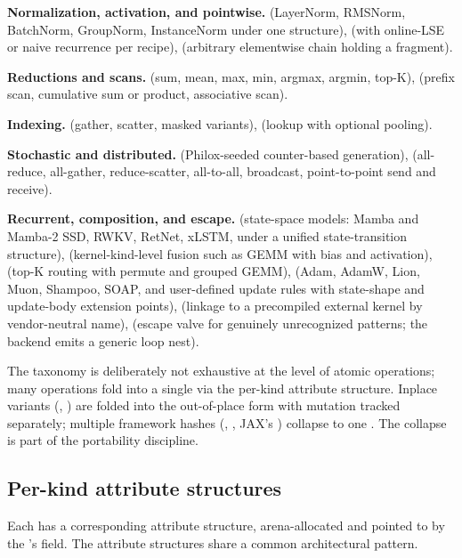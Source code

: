 \textbf{Normalization, activation, and pointwise.}
 (LayerNorm, RMSNorm, BatchNorm, GroupNorm, InstanceNorm under one structure),  (with online-LSE or naive recurrence per recipe),  (arbitrary elementwise chain holding a  fragment).

\textbf{Reductions and scans.}
 (sum, mean, max, min, argmax, argmin, top-K),  (prefix scan, cumulative sum or product, associative scan).

\textbf{Indexing.}
 (gather, scatter, masked variants),  (lookup with optional pooling).

\textbf{Stochastic and distributed.}
 (Philox-seeded counter-based generation),  (all-reduce, all-gather, reduce-scatter, all-to-all, broadcast, point-to-point send and receive).

\textbf{Recurrent, composition, and escape.}
 (state-space models: Mamba and Mamba-2 SSD, RWKV, RetNet, xLSTM, under a unified state-transition structure),  (kernel-kind-level fusion such as GEMM with bias and activation),  (top-K routing with permute and grouped GEMM),  (Adam, AdamW, Lion, Muon, Shampoo, SOAP, and user-defined update rules with state-shape and update-body extension points),  (linkage to a precompiled external kernel by vendor-neutral name),  (escape valve for genuinely unrecognized patterns; the backend emits a generic loop nest).

The taxonomy is deliberately not exhaustive at the level of atomic operations; many operations fold into a single  via the per-kind attribute structure.
Inplace variants (, ) are folded into the out-of-place form with mutation tracked separately; multiple framework hashes (, , JAX's ) collapse to one .
The collapse is part of the portability discipline.

\subsection{Per-kind attribute structures}
\label{sec:ir002-attrs}

Each  has a corresponding attribute structure, arena-allocated and pointed to by the 's  field.
The attribute structures share a common architectural pattern.

